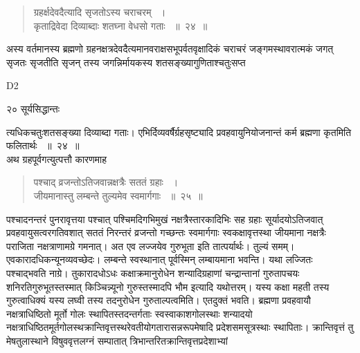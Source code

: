 \documentclass[11pt, openany]{book}
\begin{document}
 
 \begin{quote}
  {\ssi ग्रहर्क्षदेवदैत्यादि सृजतोऽस्य चराचरम् ~।\\ 
कृताद्रिवेदा दिव्याब्दाः शतघ्ना वेधसो गताः ~॥~२४~॥}
\end{quote}
\begin{sloppypar}
 अस्य वर्तमानस्य ब्रह्मणो ग्रहनक्षत्रदेवदैत्यमानवराक्षसभूपर्वतवृक्षादिकं चराचरं जङ्गमस्थावरात्मकं जगत् सृजतः सृजतीति सृजन् तस्य जगन्निर्मायकस्य शतसङ्ख्यागुणिताश्चतुःसप्त\textendash
\end{sloppypar}

{\tiny{D2}}

\newpage

\noindent २० \hspace{4cm} सूर्यसिद्धान्तः
\vspace{1cm}

त्यधिकचतुःशतसङ्ख्या दिव्याब्दा गताः। एभिर्दिव्यवर्षैर्ग्रहसृष्ट्यादि प्रवहवायुनियोजनान्तं कर्म ब्रह्मणा कृतमिति फलितार्थः ~॥~२४~॥\\ 
\noindent अथ ग्रहपूर्वगत्युत्पत्तौ कारणमाह\textendash

 
 \begin{quote}
 {\ssi पश्चाद् व्रजन्तोऽतिजवान्नक्षत्रैः सततं ग्रहाः ~।\\
जीयमानास्तु लम्बन्ते तुल्यमेव स्वमार्गगाः ~॥~२५~॥}
\end{quote}
\begin{sloppypar}
 पश्चादनन्तरं पुनरावृत्तया पश्चात् पश्चिमदिगभिमुखं नक्षत्रैस्तारकादिभिः सह ग्रहाः सूर्यादयोऽतिजवात् प्रवहवायुसत्वरगतिवशात् सततं निरन्तरं व्रजन्तो गच्छन्तः स्वमार्गगाः स्वकक्षावृत्तस्था जीयमाना नक्षत्रैः पराजिता नक्षत्राणामग्रे गमनात्। अत एव लज्जयेव गुरुभूता इति तात्पर्यार्थः। तुल्यं समम्। एवकारादधिकन्यूनव्यवच्छेदः। लम्बन्ते स्वस्थानात् पूर्वस्मिन् लम्बायमाना भवन्ति। यथा लज्जितः पश्चाद्भवति नाग्रे। तुकारादधोऽधः कक्षाक्रमानुरोधेन शन्यादिग्रहाणां चन्द्रान्तानां गुरुतापचयः शनिरतिगुरुभूतस्तस्मात् किञ्चिन्न्यूनो गुरुस्तस्मादपि भौम इत्यादि यथोत्तरम्। यस्य कक्षा महती तस्य गुरुत्वाधिक्यं यस्य लघ्वी तस्य तदनुरोधेन गुरुताल्पत्वमिति। एतदुक्तं भवति। ब्रह्मणा प्रवहवायौ नक्षत्राधिष्ठितो मूर्तो गोलः स्थापितस्तदन्तर्गताः स्वस्वाकाशगोलस्थाः शन्यादयो नक्षत्राधिष्ठितमूर्तगोलस्थक्रान्तिवृत्तस्थरेवतीयोगतारासन्नरूपमेषादि प्रदेशसमसूत्रस्थाः स्थापिताः। क्रान्तिवृत्तं तु मेषतुलास्थाने विषुववृत्तलग्नं सम्पातात् त्रिभान्तरितक्रान्तिवृत्तप्रदेशाभ्यां
\end{sloppypar}
\end{document}

